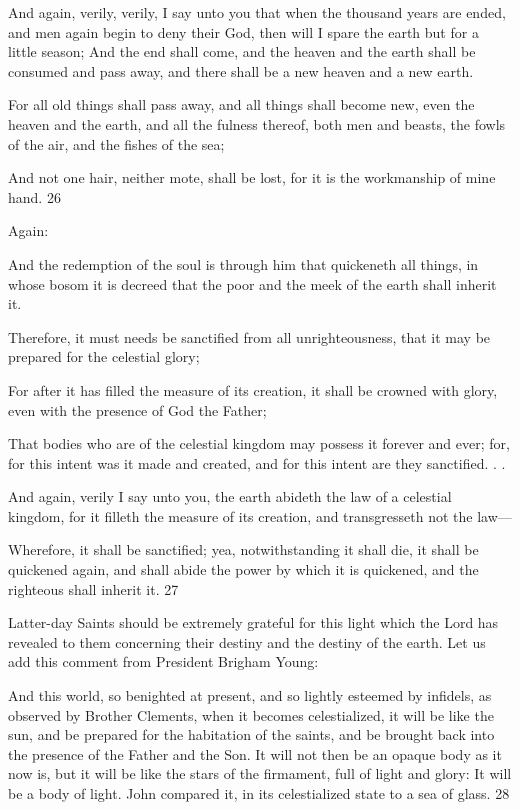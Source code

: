 And again, verily, verily, I say unto you that when the thousand years are ended, and men
again begin to deny their God, then will I spare the earth but for a little season;
And the end shall come, and the heaven and the earth shall be consumed and pass away, and
there shall be a new heaven and a new earth.

For all old things shall pass away, and all things shall become new, even the heaven and the
earth, and all the fulness thereof, both men and beasts, the fowls of the air, and the fishes of
the sea;

And not one hair, neither mote, shall be lost, for it is the workmanship of mine hand. 26

Again:

And the redemption of the soul is through him that quickeneth all things, in whose bosom it
is decreed that the poor and the meek of the earth shall inherit it.

Therefore, it must needs be sanctified from all unrighteousness, that it may be prepared for
the celestial glory;

For after it has filled the measure of its creation, it shall be crowned with glory, even with the
presence of God the Father;

That bodies who are of the celestial kingdom may possess it forever and ever; for, for this
intent was it made and created, and for this intent are they sanctified. . .

And again, verily I say unto you, the earth abideth the law of a celestial kingdom, for it filleth
the measure of its creation, and transgresseth not the law—

Wherefore, it shall be sanctified; yea, notwithstanding it shall die, it shall be quickened again,
and shall abide the power by which it is quickened, and the righteous shall inherit it. 27

Latter-day Saints should be extremely grateful for this light which the Lord has revealed to
them concerning their destiny and the destiny of the earth. Let us add this comment from
President Brigham Young:

And this world, so benighted at present, and so lightly esteemed by infidels, as observed by
Brother Clements, when it becomes celestialized, it will be like the sun, and be prepared for
the habitation of the saints, and be brought back into the presence of the Father and the Son.
It will not then be an opaque body as it now is, but it will be like the stars of the firmament,
full of light and glory: It will be a body of light. John compared it, in its celestialized state to
a sea of glass. 28

